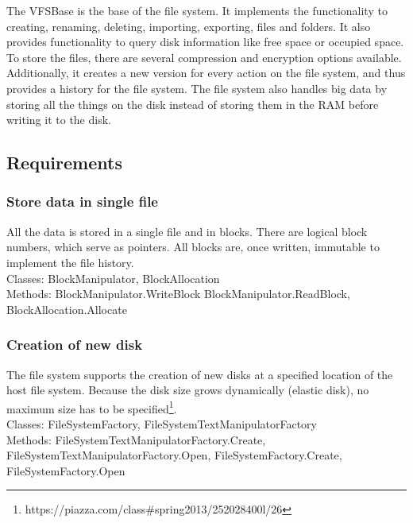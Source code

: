\documentclass[JCDReport.tex]{subfiles}
\begin{document}
The VFSBase is the base of the file system. It implements the functionality to creating, renaming, deleting, importing, exporting, files and folders. It also provides functionality to query disk information like free space or occupied space. To store the files, there are several compression and encryption options available. Additionally, it creates a new version for every action on the file system, and thus provides a history for the file system. The file system also handles big data by storing all the things on the disk instead of storing them in the RAM before writing it to the disk.

\subsection{Requirements}





\subsubsection{Store data in single file}
All the data is stored in a single file and in blocks. There are logical block numbers, which serve as pointers. All blocks are, once written, immutable to implement the file history.\\
Classes: BlockManipulator, BlockAllocation\\
Methods: BlockManipulator.WriteBlock BlockManipulator.ReadBlock, BlockAllocation.Allocate\\

\subsubsection{Creation of new disk}
The file system supports the creation of new disks at a specified location of the host file system. Because the disk size grows dynamically (elastic disk), no maximum size has to be specified\footnote{https://piazza.com/class\#spring2013/252028400l/26}.\\
Classes: FileSystemFactory, FileSystemTextManipulatorFactory\\
Methods: FileSystemTextManipulatorFactory.Create, FileSystemTextManipulatorFactory.Open, FileSystemFactory.Create, FileSystemFactory.Open\\
\end{document}
